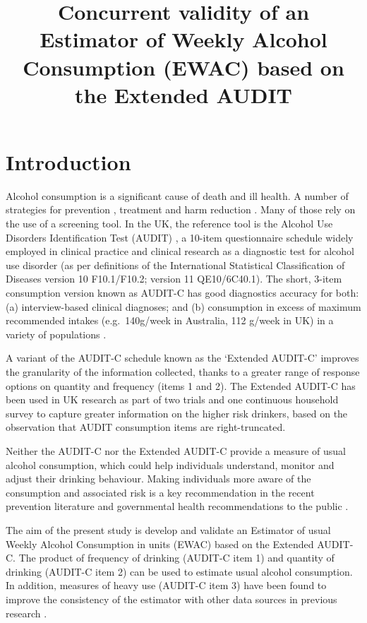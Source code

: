\documentclass[]{article}
\title{Concurrent validity of an Estimator of Weekly Alcohol Consumption (EWAC)
based on the Extended AUDIT}
\author{}
\date{}
\begin{document}
\maketitle

{
\setcounter{tocdepth}{2}
\tableofcontents
}
\hypertarget{introduction}{%
\section{Introduction}\label{introduction}}

Alcohol consumption is a significant cause of death and ill health. A
number of strategies for prevention \citep{NICE-PH24}, treatment and
harm reduction \citep{NICE-CG115}. Many of those rely on the use of a
screening tool. In the UK, the reference tool is the Alcohol Use
Disorders Identification Test (AUDIT) \citep{Babor2001}, a 10-item
questionnaire schedule widely employed in clinical practice and clinical
research as a diagnostic test for alcohol use disorder (as per
definitions of the International Statistical Classification of Diseases
version 10 F10.1/F10.2; version 11 QE10/6C40.1). The short, 3-item
consumption version known as AUDIT-C has good diagnostics accuracy for
both: (a) interview-based clinical diagnoses; and (b) consumption in
excess of maximum recommended intakes (e.g.~140g/week in Australia, 112
g/week in UK) in a variety of populations \citep{DeMeneses-Gaya2009}.

A variant of the AUDIT-C schedule known as the `Extended AUDIT-C'
improves the granularity of the information collected, thanks to a
greater range of response options on quantity and frequency (items 1 and
2). The Extended AUDIT-C has been used in UK research as part of two
trials \citep{Crane2018, Kaner2013c} and one continuous
household survey \citep{Beard2015a} to capture greater information on
the higher risk drinkers, based on the observation that AUDIT
consumption items are right-truncated.

Neither the AUDIT-C nor the Extended AUDIT-C provide a measure of usual
alcohol consumption, which could help individuals understand, monitor
and adjust their drinking behaviour. Making individuals more aware of
the consumption and associated risk is a key recommendation in the
recent prevention literature \citep{Rehm2016,Nutt2014} and
governmental health recommendations to the public
\citep{AlcoholCMO2016b,AU.alcoguidelines2009}.

The aim of the present study is develop and validate an Estimator of
usual Weekly Alcohol Consumption in units (EWAC) based on the Extended
AUDIT-C. The product of frequency of drinking (AUDIT-C item 1) and
quantity of drinking (AUDIT-C item 2) can be used to estimate usual
alcohol consumption. In addition, measures of heavy use (AUDIT-C item 3)
have been found to improve the consistency of the estimator with other
data sources in previous research \citep{Lemmens1992}.
\end{document}
